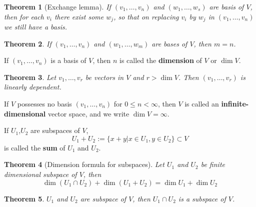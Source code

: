 \documentclass[letter]{article}
\newtheorem{theorem}{Theorem}[section]
\newenvironment{definition}[1][Definition]{\begin{trivlist}
\item[\hskip \labelsep {\bfseries #1}]}{\end{trivlist}}
\begin{document}
\begin{theorem}[Exchange lemma]
If $(v_1,\ldots,v_n)$ and $(w_1,\ldots,w_s)$ are basis of $V$, then for each $v_i$ there exist some $w_j$, so that on replacing $v_i$ by $w_j$ in $(v_1,\ldots,v_n)$ we still have a basis.
\end{theorem}
\begin{theorem}
If $(v_1,\ldots,v_n)$ and $(w_1,\ldots,w_m)$ are bases of $V$, then $m=n$.
\end{theorem}

\begin{definition}
If $(v_1,\ldots,v_n)$ is a basis of $V$, then $n$ is called the \textbf{dimension} of $V$ or $\dim V$.
\end{definition}

\begin{theorem}
Let $v_1,\ldots,v_r$ be vectors in $V$ and $r>\dim V$. Then $(v_1,\ldots,v_r)$ is linearly dependent.
\end{theorem}

\begin{definition}
If $V$ possesses no basis $(v_1,\ldots,v_n)$ for $0\leq n < \infty$, then $V$ is called an \textbf{infinite-dimensional} vector space, and we write $\dim V = \infty$.
\end{definition}

\begin{definition}
If $U_1$,$U_2$ are subspaces of $V$,
\[
U_1+U_2 := \{x+y| x\in U_1, y\in U_2\} \subset V
\]
is called the \textbf{sum} of $U_1$ and $U_2$.
\end{definition}

\begin{theorem}[Dimension formula for subspaces]
Let $U_1$ and $U_2$ be finite dimensional subspace of $V$, then
\[
\dim(U_1\cap U_2) + \dim(U_1+U_2) = \dim U_1 + \dim U_2
\]
\end{theorem}

\begin{theorem}
$U_1$ and $U_2$ are subspace of $V$, then $U_1 \cap U_2$ is a subspace of $V$.
\end{theorem}
\end{document}
